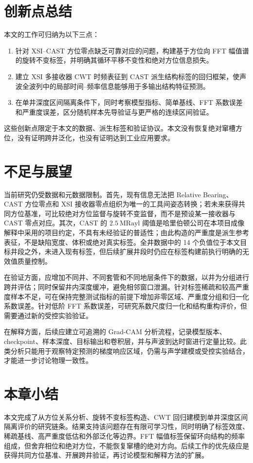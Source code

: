 \section{创新点总结}

本文的工作可归纳为以下三点：

\begin{enumerate}
  \item 针对 XSI--CAST 方位零点缺乏可靠对应的问题，构建基于方位向 FFT 幅值谱的旋转不变标签，并明确其循环平移不变性和绝对方位信息损失。
  \item 建立 XSI 多接收器 CWT 时频表征到 CAST 派生结构标签的回归框架，使声波全波列中的局部时间--频率信息能够用于多输出结构特征预测。
  \item 在单井深度区间隔离条件下，同时考察模型指标、简单基线、FFT 系数误差和严重度误差，区分随机样本先导验证与更严格的连续区间验证。
\end{enumerate}

这些创新点限定于本文的数据、派生标签和验证协议。本文没有恢复绝对窜槽方位，没有证明跨井泛化，也没有证明达到工业应用要求。

\section{不足与展望}

当前研究仍受数据和元数据限制。首先，现有信息无法把 Relative Bearing、CAST 方位零点和 XSI 接收器零点组织为唯一的工具间姿态转换；若未来获得共同方位基准，可比较绝对方位监督与旋转不变监督，而不是预设某一接收器与 CAST 零点对应。其次，CAST 的 $2.5~\mathrm{MRayl}$ 阈值是哈里伯顿公司在本项目成像解释中采用的项目约定，不具有未经验证的普适性；由此构造的严重度是派生参考表征，不是缺陷宽度、体积或绝对真实标签。全井数据中的 14 个负值位于本文目标井段之外，未进入现有标签，但后续扩展井段时仍应在标签构建前执行明确的无效值质量控制。

在验证方面，应增加不同井、不同套管和不同地层条件下的数据，以井为分组进行跨井评估；同时保留井内深度缓冲，避免相邻窗口泄漏。针对标签稀疏和较高严重度样本不足，可在保持完整测试指标的前提下增加非零区域、严重度分组和归一化系数误差。针对低阶 FFT 系数误差，可研究系数尺度归一化和结构重构评价，但需要通过新的受控实验验证。

在解释方面，后续应建立可追溯的 Grad-CAM 分析流程，记录模型版本、checkpoint、样本深度、目标输出和卷积层，并与声波到达时窗进行定量比较。此类分析只能用于观察特定预测的梯度响应区域，仍需与声学建模或受控实验结合，才能进一步讨论物理一致性。

\section{本章小结}

本文完成了从方位关系分析、旋转不变标签构造、CWT 回归建模到单井深度区间隔离评价的研究链条。结果支持该问题存在有限可学习性，同时明确了标签效度、稀疏基线、高严重度低估和外部泛化等边界。FFT 幅值标签保留环向结构的频率组成，但舍弃相位和绝对方位，不能恢复窜槽的绝对方向。后续工作的优先级应是获得共同方位基准、开展跨井验证，再讨论模型和解释方法的扩展。
